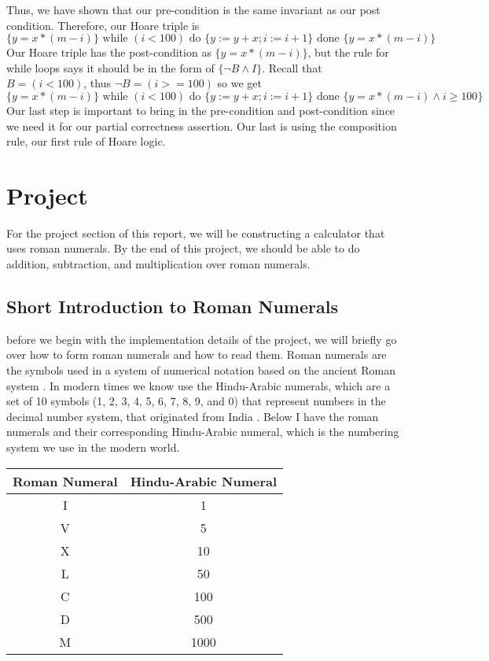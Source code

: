 \documentclass{article}
\begin{document}
Thus, we have shown that our pre-condition is the same invariant as our post condition. Therefore, our Hoare triple is
$$\{ y = x * (m-i)\} \text{ while } (i < 100) \text{ do } \{y := y + x; i := i + 1\} \text{ done } \{ y = x * (m-i)\}$$
Our Hoare triple has the post-condition as $\{ y = x * (m-i) \}$, but the rule for while loops says it should be in the form of $\{\neg B \wedge I \}$. Recall that $ B = (i < 100)$, thus $ \neg B = (i >= 100)$ so we get 
$$\{ y = x * (m-i)\} \text{ while } (i < 100) \text{ do } \{y := y + x; i := i + 1\} \text{ done } \{ y = x * (m-i) \wedge i \geq 100\}$$
\vspace{\baselineskip}
Our last step is important to bring in the pre-condition and post-condition since we need it for our partial correctness assertion. Our last is using the composition rule, our first rule of Hoare logic.

\section{Project}

For the project section of this report, we will be constructing a calculator that uses roman numerals. By the end of this project, we should be able to do addition, subtraction, and multiplication over roman numerals.

\subsection{Short Introduction to Roman Numerals}
before we begin with the implementation details of the project, we will briefly go over how to form roman numerals and how to read them. Roman numerals are the symbols used in a system of numerical notation based on the ancient Roman system \cite{14}. In modern times we know use the Hindu-Arabic numerals, which are a set of 10 symbols (1, 2, 3, 4, 5, 6, 7, 8, 9, and 0) that represent numbers in the decimal number system, that originated from India \cite{15}. Below I have the roman numerals and their corresponding Hindu-Arabic numeral, which is the numbering system we use in the modern world. 

\begin{center}
\begin{tabular}{||c c||} 
 \hline
  Roman Numeral & Hindu-Arabic Numeral \\ [0.5ex] 
 \hline
 I & 1 \\ 
 \hline\hline
 V & 5 \\
 \hline
 X & 10 \\
 \hline
 L & 50 \\
 \hline
 C & 100 \\ 
 \hline
 D & 500 \\ 
 \hline
 M & 1000 \\ 
 \hline
\end{tabular}
\end{center}
\end{document}
